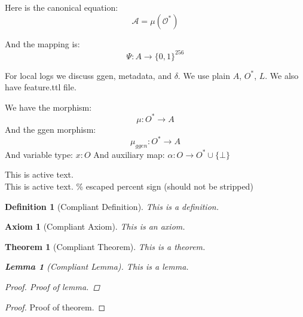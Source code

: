 \documentclass{article}
\newtheorem{theorem}{Theorem}
\newtheorem{lemma}{Lemma}
\newtheorem{definition}{Definition}
\newtheorem{axiom}{Axiom}
\begin{document}
Here is the canonical equation:
$$ \mathcal{A}=\mu(\mathcal{O}^{*}) $$

And the mapping is:
$$ \Psi: A \to \{0,1\}^{256} $$

For local logs we discuss ggen, metadata, and $\delta$. We use plain $A$, $O^*$, $L$.
We also have feature.ttl file.

We have the morphism:
$$ \mu: O^* \to A $$
And the ggen morphism:
$$ \mu_{ggen}: O^* \to A $$
And variable type: $x: O$
And auxiliary map: $\alpha: O \to O^* \cup \{\bot\}$

This is active text. \\%
This is active text. \% escaped percent sign (should not be stripped)

\begin{definition}[Compliant Definition]
This is a definition.
\end{definition}

\begin{axiom}[Compliant Axiom]
This is an axiom.
\end{axiom}

\begin{theorem}[Compliant Theorem]
This is a theorem.
  \begin{lemma}[Compliant Lemma]
  This is a lemma.
  \end{lemma}
  \begin{proof}
  Proof of lemma.
  \end{proof}
\end{theorem}
\begin{proof}
Proof of theorem.
\end{proof}
\end{document}
